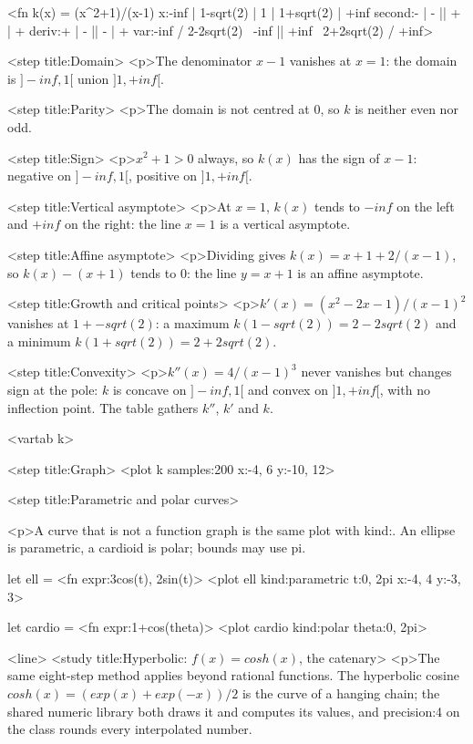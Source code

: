\documentclass[
  margins=8,
  font=Latin Modern Roman,
  size=12,
  linespread=1.4,
  lang=en,
  precision=4
]{scholatex}
\begin{document}
<fn k(x) = (x^2+1)/(x-1)
            x:{-inf | 1-sqrt(2) | 1 | 1+sqrt(2) | +inf}
            second:{- | - || + | +}
            deriv:{+ | - || - | +}
            var:{-inf / 2-2sqrt(2) \ -inf || +inf \ 2+2sqrt(2) / +inf}>

<step title:{Domain}>{
<p>The denominator $x - 1$ vanishes at $x = 1$: the domain is
$]-inf, 1[$ union $]1, +inf[$.
}

<step title:{Parity}>{
<p>The domain is not centred at $0$, so $k$ is neither even nor odd.
}

<step title:{Sign}>{
<p>$x^2 + 1 > 0$ always, so $k(x)$ has the sign of $x - 1$: negative on
$]-inf, 1[$, positive on $]1, +inf[$.
}

<step title:{Vertical asymptote}>{
<p>At $x = 1$, $k(x)$ tends to $-inf$ on the left and $+inf$ on the
right: the line $x = 1$ is a vertical asymptote.
}

<step title:{Affine asymptote}>{
<p>Dividing gives $k(x) = x + 1 + 2/(x-1)$, so $k(x) - (x+1)$ tends to
$0$: the line $y = x + 1$ is an affine asymptote.
}

<step title:{Growth and critical points}>{
<p>$k'(x) = (x^2-2x-1)/(x-1)^2$ vanishes at $1 +- sqrt(2)$: a maximum
$k(1-sqrt(2)) = 2 - 2sqrt(2)$ and a minimum $k(1+sqrt(2)) = 2 + 2sqrt(2)$.
}

<step title:{Convexity}>{
<p>$k''(x) = 4/(x-1)^3$ never vanishes but changes sign at the pole:
$k$ is concave on $]-inf, 1[$ and convex on $]1, +inf[$, with no
inflection point. The table gathers $k''$, $k'$ and $k$.
}

<vartab k>

<step title:{Graph}>{
<plot k samples:200 x:{-4, 6} y:{-10, 12}>
}


<step title:{Parametric and polar curves}>{
<p>A curve that is not a function graph is the same plot with kind:. An
ellipse is parametric, a cardioid is polar; bounds may use pi.

let ell = <fn expr:{3cos(t), 2sin(t)}>
<plot ell kind:parametric t:{0, 2pi} x:{-4, 4} y:{-3, 3}>

let cardio = <fn expr:{1+cos(theta)}>
<plot cardio kind:polar theta:{0, 2pi}>
}

<line>
<study title:{Hyperbolic: $f(x) = cosh(x)$, the catenary}>{
<p>The same eight-step method applies beyond rational functions. The
hyperbolic cosine $cosh(x) = (exp(x) + exp(-x))/2$ is the curve of a
hanging chain; the shared numeric library both draws it and computes its
values, and precision:4 on the class rounds every interpolated number.
}
\end{document}
